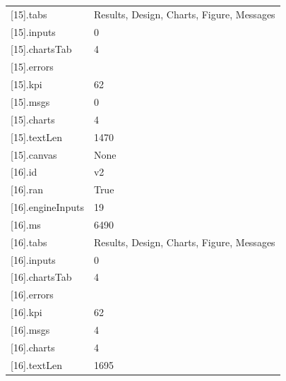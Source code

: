 {\begin{longtable}{p{}p{}}
{}[15].tabs & Results, Design, Charts, Figure, Messages\\
{}[15].inputs & 0\\
{}[15].chartsTab & 4\\
{}[15].errors & \\
{}[15].kpi & 62\\
{}[15].msgs & 0\\
{}[15].charts & 4\\
{}[15].textLen & 1470\\
{}[15].canvas & None\\
{}[16].id & v2\\
{}[16].ran & True\\
{}[16].engineInputs & 19\\
{}[16].ms & 6490\\
{}[16].tabs & Results, Design, Charts, Figure, Messages\\
{}[16].inputs & 0\\
{}[16].chartsTab & 4\\
{}[16].errors & \\
{}[16].kpi & 62\\
{}[16].msgs & 4\\
{}[16].charts & 4\\
{}[16].textLen & 1695\\
\bottomrule\end{longtable}}

